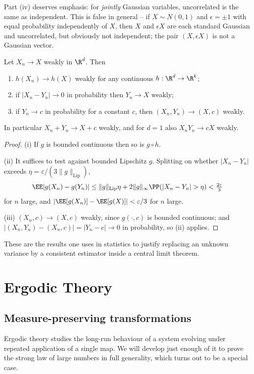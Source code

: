 Part (iv) deserves emphasis: for \emph{jointly} Gaussian variables, uncorrelated is the same as independent. This is false in general -- if $X\sim N(0,1)$ and $\epsilon = \pm1$ with equal probability independently of $X$, then $X$ and $\epsilon X$ are each standard Gaussian and uncorrelated, but obviously not independent; the pair $(X,\epsilon X)$ is not a Gaussian vector.

\begin{proposition}\label{prop:slutsky}
	Let $X_n \to X$ weakly in $\R^d$. Then
	\begin{enumerate}[label=(\roman*)]
		\item $h(X_n)\to h(X)$ weakly for any continuous $h : \R^d\to\R^k$;
		\item if $|X_n - Y_n|\to0$ in probability then $Y_n \to X$ weakly;
		\item if $Y_n \to c$ in probability for a constant $c$, then $(X_n,Y_n)\to(X,c)$ weakly.
	\end{enumerate}
	In particular $X_n + Y_n \to X+c$ weakly, and for $d=1$ also $X_nY_n \to cX$ weakly.
\end{proposition}
\begin{proof}
	(i) If $g$ is bounded continuous then so is $g\circ h$.

	(ii) It suffices to test against bounded Lipschitz $g$. Splitting on whether $|X_n - Y_n|$ exceeds $\eta = \varepsilon/(3\|g\|_{\mathrm{Lip}})$,
	$$
	\EE|g(X_n)-g(Y_n)| \leq \|g\|_{\mathrm{Lip}}\eta + 2\|g\|_\infty\PP(|X_n-Y_n|>\eta)<\tfrac{2\varepsilon}{3}
	$$
	for $n$ large, and $|\EE[g(X_n)]-\EE[g(X)]|<\varepsilon/3$ for $n$ large.

	(iii) $(X_n,c)\to(X,c)$ weakly, since $g(\cdot,c)$ is bounded continuous; and $|(X_n,Y_n)-(X_n,c)|=|Y_n-c|\to0$ in probability, so (ii) applies.
\end{proof}

These are the results one uses in statistics to justify replacing an unknown variance by a consistent estimator inside a central limit theorem.
\section{Ergodic Theory}

\subsection{Measure-preserving transformations}

Ergodic theory studies the long-run behaviour of a system evolving under repeated application of a single map. We will develop just enough of it to prove the strong law of large numbers in full generality, which turns out to be a special case.

